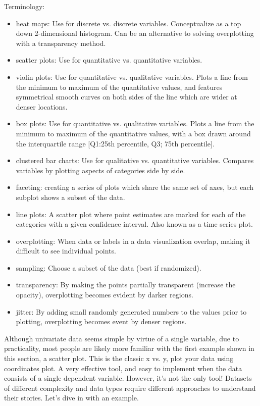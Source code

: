 Terminology:
\begin{itemize}
	\item heat maps: Use for discrete vs. discrete variables. Conceptualize as a top down 2-dimensional histogram. Can be an alternative to solving overplotting with a transparency method.
	\item scatter plots: Use for quantitative vs. quantitative variables.
	\item violin plots: Use for quantitative vs. qualitative variables. Plots a line from the minimum to maximum of the quantitative values, and features symmetrical smooth curves on both sides of the line which are wider at denser locations.
	\item box plots: Use for quantitative vs. qualitative variables. Plots a line from the minimum to maximum of the quantitative values, with a box drawn around the interquartile range [Q1:25th percentile, Q3; 75th percentile].
	\item clustered bar charts: Use for qualitative vs. quantitative variables. Compares variables by plotting aspects of categories side by side.
	\item faceting: creating a series of plots which share the same set of axes, but each subplot shows a subset of the data.
	\item line plots: A scatter plot where point estimates are marked for each of the categories with a given confidence interval. Also known as a time series plot.
	\item overplotting: When data or labels in a data visualization overlap, making it difficult to see individual points.
	\item sampling: Choose a subset of the data (best if randomized).
	\item transparency: By making the points partially transparent (increase the opacity), overplotting becomes evident by darker regions.
	\item jitter: By adding small randomly generated numbers to the values prior to plotting, overplotting becomes event by denser regions.
\end{itemize}

Although univariate data seems simple by virtue of a single variable, due to practicality, most people are likely more familiar with the first example shown in this section, a scatter plot. This is the classic x vs. y, plot your data using coordinates plot. A very effective tool, and easy to implement when the data consists of a single dependent variable. However, it's not the only tool! Datasets of different complexity and data types require different approaches to understand their stories. Let's dive in with an example.

